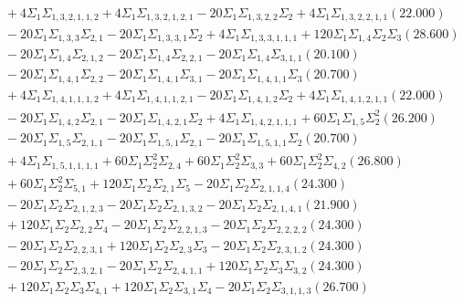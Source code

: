 \documentclass[12pt]{article}
\begin{document}
\begin{landscape}
\begin{align*}
		&\quad\quad +4\Sigma_{1}\Sigma_{1,3,2,1,1,2}+4\Sigma_{1}\Sigma_{1,3,2,1,2,1}-20\Sigma_{1}\Sigma_{1,3,2,2}\Sigma_{2}+4\Sigma_{1}\Sigma_{1,3,2,2,1,1}(22.000) \\ 
		&\quad\quad -20\Sigma_{1}\Sigma_{1,3,3}\Sigma_{2,1}-20\Sigma_{1}\Sigma_{1,3,3,1}\Sigma_{2}+4\Sigma_{1}\Sigma_{1,3,3,1,1,1}+120\Sigma_{1}\Sigma_{1,4}\Sigma_{2}\Sigma_{3}(28.600) \\ 
		&\quad\quad -20\Sigma_{1}\Sigma_{1,4}\Sigma_{2,1,2}-20\Sigma_{1}\Sigma_{1,4}\Sigma_{2,2,1}-20\Sigma_{1}\Sigma_{1,4}\Sigma_{3,1,1}(20.100) \\ 
		&\quad\quad -20\Sigma_{1}\Sigma_{1,4,1}\Sigma_{2,2}-20\Sigma_{1}\Sigma_{1,4,1}\Sigma_{3,1}-20\Sigma_{1}\Sigma_{1,4,1,1}\Sigma_{3}(20.700) \\ 
		&\quad\quad +4\Sigma_{1}\Sigma_{1,4,1,1,1,2}+4\Sigma_{1}\Sigma_{1,4,1,1,2,1}-20\Sigma_{1}\Sigma_{1,4,1,2}\Sigma_{2}+4\Sigma_{1}\Sigma_{1,4,1,2,1,1}(22.000) \\ 
		&\quad\quad -20\Sigma_{1}\Sigma_{1,4,2}\Sigma_{2,1}-20\Sigma_{1}\Sigma_{1,4,2,1}\Sigma_{2}+4\Sigma_{1}\Sigma_{1,4,2,1,1,1}+60\Sigma_{1}\Sigma_{1,5}\Sigma_{2}^{2}(26.200) \\ 
		&\quad\quad -20\Sigma_{1}\Sigma_{1,5}\Sigma_{2,1,1}-20\Sigma_{1}\Sigma_{1,5,1}\Sigma_{2,1}-20\Sigma_{1}\Sigma_{1,5,1,1}\Sigma_{2}(20.700) \\ 
		&\quad\quad +4\Sigma_{1}\Sigma_{1,5,1,1,1,1}+60\Sigma_{1}\Sigma_{2}^{2}\Sigma_{2,4}+60\Sigma_{1}\Sigma_{2}^{2}\Sigma_{3,3}+60\Sigma_{1}\Sigma_{2}^{2}\Sigma_{4,2}(26.800) \\ 
		&\quad\quad +60\Sigma_{1}\Sigma_{2}^{2}\Sigma_{5,1}+120\Sigma_{1}\Sigma_{2}\Sigma_{2,1}\Sigma_{5}-20\Sigma_{1}\Sigma_{2}\Sigma_{2,1,1,4}(24.300) \\ 
		&\quad\quad -20\Sigma_{1}\Sigma_{2}\Sigma_{2,1,2,3}-20\Sigma_{1}\Sigma_{2}\Sigma_{2,1,3,2}-20\Sigma_{1}\Sigma_{2}\Sigma_{2,1,4,1}(21.900) \\ 
		&\quad\quad +120\Sigma_{1}\Sigma_{2}\Sigma_{2,2}\Sigma_{4}-20\Sigma_{1}\Sigma_{2}\Sigma_{2,2,1,3}-20\Sigma_{1}\Sigma_{2}\Sigma_{2,2,2,2}(24.300) \\ 
		&\quad\quad -20\Sigma_{1}\Sigma_{2}\Sigma_{2,2,3,1}+120\Sigma_{1}\Sigma_{2}\Sigma_{2,3}\Sigma_{3}-20\Sigma_{1}\Sigma_{2}\Sigma_{2,3,1,2}(24.300) \\ 
		&\quad\quad -20\Sigma_{1}\Sigma_{2}\Sigma_{2,3,2,1}-20\Sigma_{1}\Sigma_{2}\Sigma_{2,4,1,1}+120\Sigma_{1}\Sigma_{2}\Sigma_{3}\Sigma_{3,2}(24.300) \\ 
		&\quad\quad +120\Sigma_{1}\Sigma_{2}\Sigma_{3}\Sigma_{4,1}+120\Sigma_{1}\Sigma_{2}\Sigma_{3,1}\Sigma_{4}-20\Sigma_{1}\Sigma_{2}\Sigma_{3,1,1,3}(26.700) \\ 

\end{align*}
\end{landscape}
\end{document}

